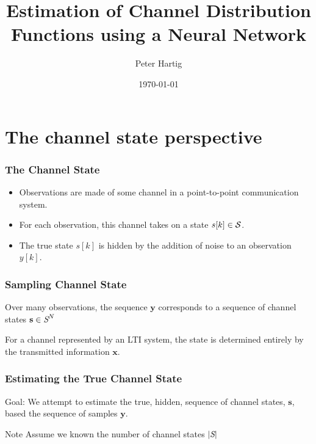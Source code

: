 \documentclass[10pt,tgadventor, onlymath]{beamer}
\title{\large \bfseries Estimation of Channel Distribution Functions using a Neural Network}
\author{Peter Hartig\\[3ex]
}
\date{\today}
\begin{document}
\frame{
\thispagestyle{empty}
\titlepage
}

\frame{
\tableofcontents
}

\section{The channel state perspective}

\begin{frame}
\frametitle{The Channel State}
\begin{itemize}
\item 
	Observations are made of some channel in a point-to-point communication system.
\item 
	For each observation, this channel takes on a state $s[k]\in \cal{S}$. 
\item 
	The true state $s[k]$ is hidden by the addition of noise to an observation $y[k]$.
\end{itemize}
\end{frame}
\begin{frame}

\frametitle{Sampling Channel State}
Over many observations, the sequence $\mathbf{y}$ corresponds to a sequence of channel states $\mathbf{s}\in\textit{\cal{S}}^N$
\begin{figure}[H]
\begin{center}
\end{center}
\end{figure}
\pause
For a channel represented by an LTI system, the state is determined entirely by the transmitted information $\mathbf{x}$.
\end{frame}

\begin{frame}
\frametitle{Estimating the True Channel State}
\begin{block}{Goal:}
We attempt to estimate the true, hidden, sequence of channel states, $\mathbf{s}$, based the sequence of samples $\mathbf{y}$.
\end{block}

\begin{block}{Note}
Assume we known the number of channel states $|\textit{\cal{S}}|$
\end{block}

\end{frame}
\end{document}
